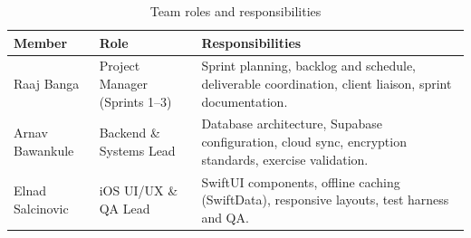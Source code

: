 \documentclass[12pt,letterpaper]{article}
\begin{document}
\begin{table}[H]
\centering
\caption{Team roles and responsibilities}
\label{tab:team}
\begin{tabularx}{\textwidth}{@{}L{3.1cm} L{3.3cm} Y@{}}
\toprule
\textbf{Member} & \textbf{Role} & \textbf{Responsibilities} \\
\midrule
Raaj Banga & Project Manager (Sprints 1--3) & Sprint planning, backlog and schedule, deliverable coordination, client liaison, sprint documentation. \\
Arnav Bawankule & Backend \& Systems Lead & Database architecture, Supabase configuration, cloud sync, encryption standards, exercise validation. \\
Elnad Salcinovic & iOS UI/UX \& QA Lead & SwiftUI components, offline caching (SwiftData), responsive layouts, test harness and QA. \\
\bottomrule
\end{tabularx}
\end{table}
\end{document}
